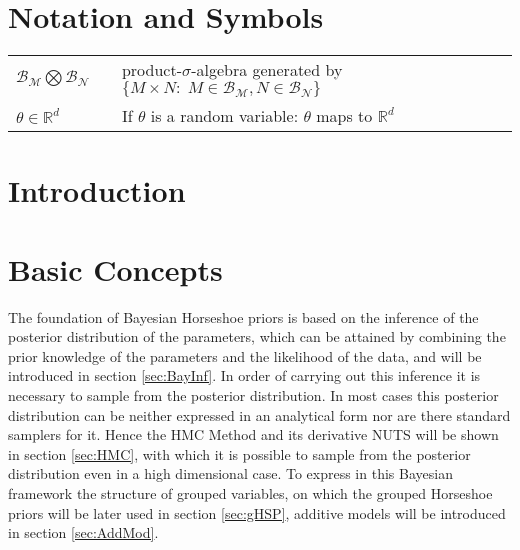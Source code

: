 \documentclass[12pt,letterpaper]{article}
\begin{document}
\newpage
\setcounter{page}{1}
\tableofcontents
\newpage


\pagestyle{fancy}
\fancyhf{}
\fancyhead[R]{\thepage}
\renewcommand{\headrulewidth}{0pt} 
\section*{Notation and Symbols}

\begin{tabular}{lll}
$\mathcal{B}_\mathcal{M}\bigotimes\mathcal{B}_\mathcal{N}$ & & product-$\sigma$-algebra generated by $\{M\times N :\; M\in\mathcal{B}_\mathcal{M}, N\in\mathcal{B}_\mathcal{N} \}$ \\
$\theta \in \mathbb{R}^d$ & & If $\theta$ is a random variable: $\theta$ maps to $\mathbb{R}^d$
\end{tabular}

\pagebreak
\section{Introduction}
\pagebreak

\section{Basic Concepts}
The foundation of Bayesian Horseshoe priors is based on the inference of the posterior distribution of the parameters, which can be attained by combining the prior knowledge of the parameters and the likelihood of the data, and will be introduced in section \ref{sec:BayInf}. In order of carrying out this inference it is necessary to sample from the posterior distribution.
In most cases this posterior distribution can be neither expressed in an analytical form nor are there standard samplers for it. Hence the HMC Method and its derivative NUTS will be shown in section \ref{sec:HMC}, with which it is possible to sample from the posterior distribution even in a high dimensional case. To express in this Bayesian framework the structure of grouped variables, on which the grouped Horseshoe priors will be later used in section \ref{sec:gHSP},  additive models will be introduced in section \ref{sec:AddMod}.
\end{document}
